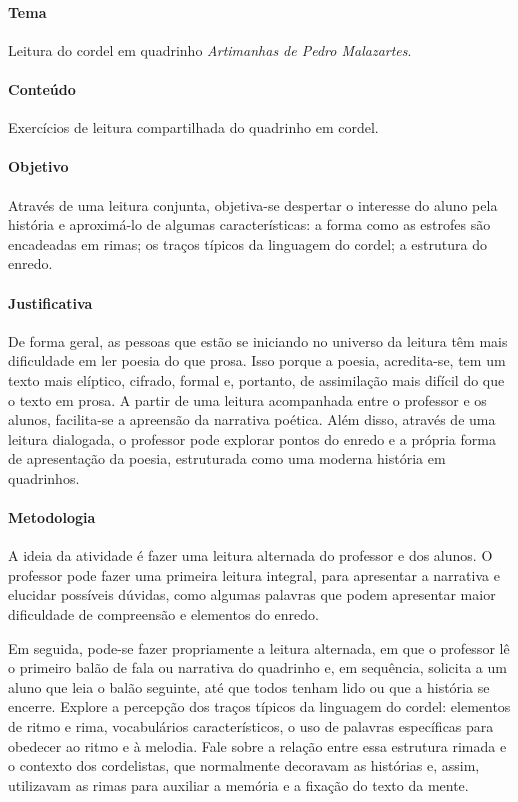 \documentclass[11pt]{extarticle}
\begin{document}
\paragraph{Tema} Leitura do cordel em quadrinho \textit{Artimanhas de Pedro Malazartes}.

\paragraph{Conteúdo} Exercícios de leitura compartilhada do quadrinho em cordel.


\paragraph{Objetivo} Através de uma leitura conjunta, objetiva-se despertar o interesse do aluno pela história e aproximá-lo de algumas características: a forma como as estrofes são encadeadas em rimas; os traços típicos da linguagem do cordel; a estrutura do enredo.

\paragraph{Justificativa} De forma geral, as pessoas que estão se iniciando no universo da leitura têm mais dificuldade em ler poesia do que prosa. Isso porque a poesia, acredita-se, tem um texto mais elíptico, cifrado, formal e, portanto, de assimilação mais difícil do que o texto em prosa. A partir de uma leitura acompanhada entre o professor e os alunos, facilita-se a apreensão da narrativa poética. Além disso, através de uma leitura dialogada, o professor pode explorar pontos do enredo e a própria forma de apresentação da poesia, estruturada como uma moderna história em quadrinhos.


\paragraph{Metodologia} A ideia da atividade é fazer uma leitura alternada do professor e dos alunos. O professor pode fazer uma primeira leitura integral, para apresentar a narrativa e elucidar possíveis dúvidas, como algumas palavras que podem apresentar maior dificuldade de compreensão e elementos do enredo.

Em seguida, pode-se fazer propriamente a leitura alternada, em que o professor lê o primeiro balão de fala ou narrativa do quadrinho e, em sequência, solicita a um aluno que leia o balão seguinte, até que todos tenham lido ou que a história se encerre.
Explore a percepção dos traços típicos da linguagem do cordel: elementos de ritmo e rima, vocabulários característicos, o uso de palavras específicas para obedecer ao ritmo e à melodia. Fale sobre a relação entre essa estrutura rimada e o contexto dos cordelistas, que normalmente decoravam as histórias e, assim, utilizavam as rimas para auxiliar a memória e a fixação do texto da mente.
\end{document}
